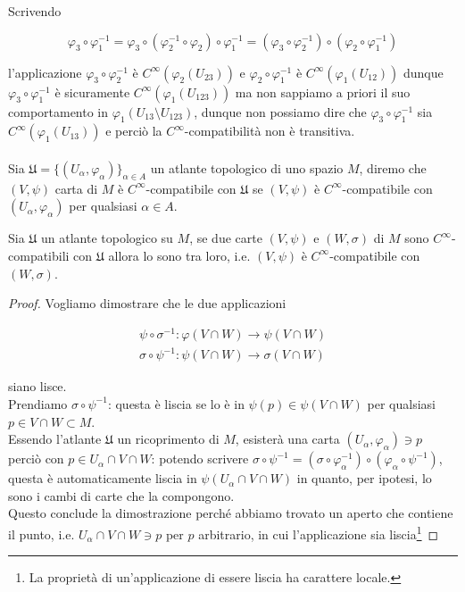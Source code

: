 Scrivendo

\begin{equation}
	\varphi_{3} \circ \varphi_{1}^{-1} = \varphi_{3} \circ (\varphi_{2}^{-1} \circ \varphi_{2}) \circ \varphi_{1}^{-1} %
	= (\varphi_{3} \circ \varphi_{2}^{-1}) \circ (\varphi_{2} \circ \varphi_{1}^{-1})
\end{equation}

l'applicazione $ \varphi_{3} \circ \varphi_{2}^{-1} $ è $ C^{\infty}(\varphi_{2}(U_{23})) $ e $ \varphi_{2} \circ \varphi_{1}^{-1} $ è $ C^{\infty}(\varphi_{1}(U_{12})) $ dunque $ \varphi_{3} \circ \varphi_{1}^{-1} $ è sicuramente $ C^{\infty}(\varphi_{1}(U_{123})) $ ma non sappiamo a priori il suo comportamento in $ \varphi_{1}(U_{13} \setminus U_{123}) $, dunque non possiamo dire che $ \varphi_{3} \circ \varphi_{1}^{-1} $ sia $ C^{\infty}(\varphi_{1}(U_{13})) $ e perciò la $ C^{\infty} $-compatibilità non è transitiva. \\ \\
%
Sia $ \mathfrak{U} = \{(U_{\alpha},\varphi_{\alpha})\}_{\alpha \in A} $ un atlante topologico di uno spazio $ M $, diremo che $ (V,\psi) $ carta di $ M $ è $ C^{\infty} $-compatibile con $ \mathfrak{U} $ se $ (V,\psi) $ è $ C^{\infty} $-compatibile con $ (U_{\alpha},\varphi_{\alpha}) $ per qualsiasi $ \alpha \in A $.

\begin{definition}
	Sia $ \mathfrak{U} $ un atlante topologico su $ M $, se due carte $ (V,\psi) $ e $ (W,\sigma) $ di $ M $ sono $ C^{\infty} $-compatibili con $ \mathfrak{U} $ allora lo sono tra loro, i.e. $ (V,\psi) $ è $ C^{\infty} $-compatibile con $ (W,\sigma) $.
\end{definition}

\begin{proof}
	Vogliamo dimostrare che le due applicazioni
	
	\begin{gather}
		\psi \circ \sigma^{-1} : \varphi(V \cap W) \to \psi(V \cap W) \\
		\sigma \circ \psi^{-1} : \psi(V \cap W) \to \sigma(V \cap W)
	\end{gather}

	siano lisce. \\
	Prendiamo $ \sigma \circ \psi^{-1} $: questa è liscia se lo è in $ \psi(p) \in \psi(V \cap W) $ per qualsiasi $ p \in V \cap W \subset M $. \\
	Essendo l'atlante $ \mathfrak{U} $ un ricoprimento di $ M $, esisterà una carta $ (U_{\alpha},\varphi_{\alpha}) \ni p $ perciò con $ p \in U_{\alpha} \cap V \cap W $: potendo scrivere $ \sigma \circ \psi^{-1} = (\sigma \circ \varphi_{\alpha}^{-1}) \circ (\varphi_{\alpha} \circ \psi^{-1}) $, questa è automaticamente liscia in $ \psi(U_{\alpha} \cap V \cap W) $ in quanto, per ipotesi, lo sono i cambi di carte che la compongono. \\
	Questo conclude la dimostrazione perché abbiamo trovato un aperto che contiene il punto, i.e. $ U_{\alpha} \cap V \cap W \ni p $ per $ p $ arbitrario, in cui l'applicazione sia liscia\footnote{%
		La proprietà di un'applicazione di essere liscia ha carattere locale.%
	}
\end{proof}

